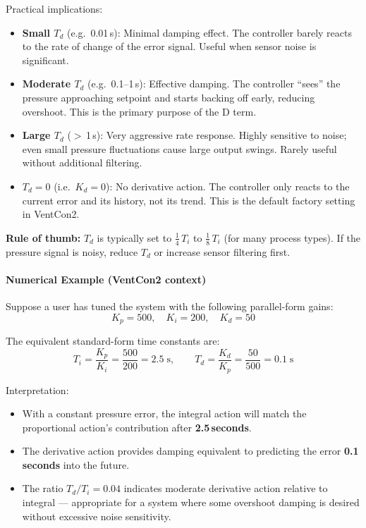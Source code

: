 \documentclass[12pt,a4paper]{article}
\begin{document}
\noindent
Practical implications:
\begin{itemize}
    \item \textbf{Small $T_d$} (e.g.\ 0.01\,s): Minimal damping effect. The controller barely reacts to the rate of change of the error signal. Useful when sensor noise is significant.
    \item \textbf{Moderate $T_d$} (e.g.\ 0.1--1\,s): Effective damping. The controller ``sees'' the pressure approaching setpoint and starts backing off early, reducing overshoot. This is the primary purpose of the D term.
    \item \textbf{Large $T_d$} ($>$\,1\,s): Very aggressive rate response. Highly sensitive to noise; even small pressure fluctuations cause large output swings. Rarely useful without additional filtering.
    \item \textbf{$T_d = 0$} (i.e.\ $K_d = 0$): No derivative action. The controller only reacts to the current error and its history, not its trend. This is the default factory setting in VentCon2.
\end{itemize}

\noindent
\textbf{Rule of thumb:} $T_d$ is typically set to $\frac{1}{4}\,T_i$ to $\frac{1}{8}\,T_i$ (for many process types). If the pressure signal is noisy, reduce $T_d$ or increase sensor filtering first.

\paragraph{Numerical Example (VentCon2 context)}

Suppose a user has tuned the system with the following parallel-form gains:
\[
K_p = 500, \quad K_i = 200, \quad K_d = 50
\]

The equivalent standard-form time constants are:
\[
T_i = \frac{K_p}{K_i} = \frac{500}{200} = 2.5\;\text{s}, \qquad
T_d = \frac{K_d}{K_p} = \frac{50}{500} = 0.1\;\text{s}
\]

\noindent
Interpretation:
\begin{itemize}
    \item With a constant pressure error, the integral action will match the proportional action's contribution after \textbf{2.5\,seconds}.
    \item The derivative action provides damping equivalent to predicting the error \textbf{0.1\,seconds} into the future.
    \item The ratio $T_d / T_i = 0.04$ indicates moderate derivative action relative to integral --- appropriate for a system where some overshoot damping is desired without excessive noise sensitivity.
\end{itemize}
\end{document}
